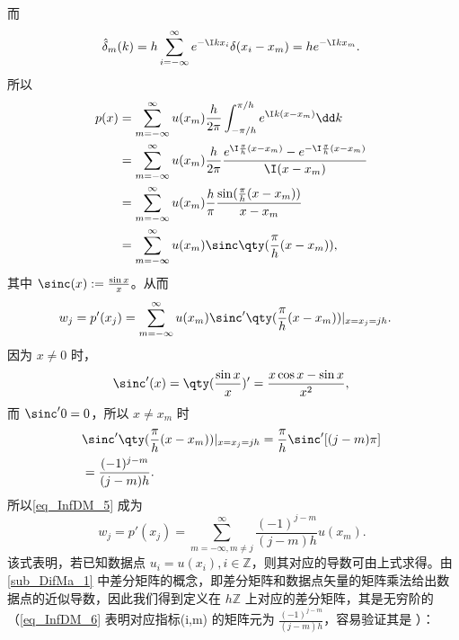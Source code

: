 而
\begin{equation}
\begin{aligned}
\hat\delta_m(k)=h\sum_{i=-\infty}^{\infty}e^{-\I kx_i}\delta(x_i-x_m)=he^{-\I kx_m}.
\end{aligned}~
\end{equation}
所以
\begin{equation}
\begin{aligned}
p(x)&=\sum\limits_{m=-\infty}^\infty u(x_m)\frac{h}{2\pi}\int_{-\pi/h}^{\pi/h} e^{\I k(x-x_m)}\dd k\\
&=\sum\limits_{m=-\infty}^\infty u(x_m)\frac{h}{2\pi}\frac{e^{\I \frac{\pi}{h}(x-x_m)}-e^{-\I \frac{\pi}{h}(x-x_m)}}{\I (x-x_m)}\\
&=\sum\limits_{m=-\infty}^\infty u(x_m)\frac{h}{\pi}\frac{\sin(\frac{\pi}{h}(x-x_m))}{x-x_m}\\
&=\sum\limits_{m=-\infty}^\infty u(x_m)\sinc \qty(\frac{\pi}{h}(x-x_m)),
\end{aligned}~
\end{equation}
其中 $\sinc(x):=\frac{\sin x}{x}$。从而
\begin{equation}\label{eq_InfDM_5}
\begin{aligned}
w_j&=p'(x_j)=\sum\limits_{m=-\infty}^\infty u(x_m)\sinc '\qty(\frac{\pi}{h}(x-x_m))|_{x=x_j=jh}.
\end{aligned}~
\end{equation}
因为 $x\neq0$ 时，
\begin{equation}
\sinc'(x)=\qty(\frac{\sin x}{x})'=\frac{x\cos x-\sin x}{x^2},~
\end{equation}
而 $\sinc'0=0$，所以 $x\neq x_m$ 时
\begin{equation}
\begin{aligned}
&\sinc '\qty(\frac{\pi}{h}(x-x_m))|_{x=x_j=jh}=\frac{\pi}{h}\sinc '[(j-m)\pi]\\
&=\frac{(-1)^{j-m}}{(j-m)h}.
\end{aligned}~
\end{equation}
所以\autoref{eq_InfDM_5} 成为
\begin{equation}\label{eq_InfDM_6}
w_j=p'(x_j)=\sum\limits_{m=-\infty,m\neq j}^\infty \frac{(-1)^{j-m}}{(j-m)h}u(x_m).~
\end{equation}
该式表明，若已知数据点 $u_i=u(x_i),i\in\mathbb Z$，则其对应的导数可由上式求得。由\autoref{sub_DifMa_1}
中差分矩阵的概念，即差分矩阵和数据点矢量的矩阵乘法给出数据点的近似导数，因此我们得到定义在 $h\mathbb Z$ 上对应的差分矩阵，其是无穷阶的（\autoref{eq_InfDM_6} 表明对应指标(i,m) 的矩阵元为 $\frac{(-1)^{j-m}}{(j-m)h}$，容易验证其是 ）：
